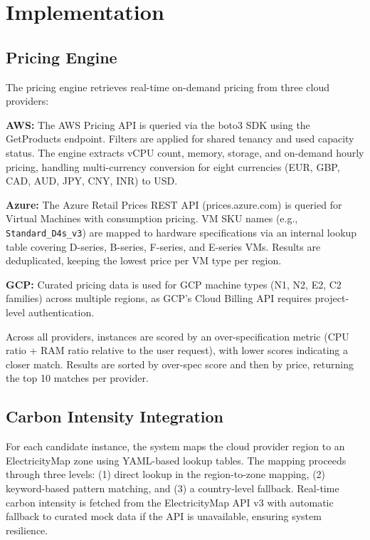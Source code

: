 \documentclass[12pt]{article}
\begin{document}
\section{Implementation}

\subsection{Pricing Engine}

The pricing engine retrieves real-time on-demand pricing from three cloud providers:

\textbf{AWS:} The AWS Pricing API is queried via the boto3 SDK using the GetProducts endpoint. Filters are applied for shared tenancy and used capacity status. The engine extracts vCPU count, memory, storage, and on-demand hourly pricing, handling multi-currency conversion for eight currencies (EUR, GBP, CAD, AUD, JPY, CNY, INR) to USD.

\textbf{Azure:} The Azure Retail Prices REST API (prices.azure.com) is queried for Virtual Machines with consumption pricing. VM SKU names (e.g., \texttt{Standard\_D4s\_v3}) are mapped to hardware specifications via an internal lookup table covering D-series, B-series, F-series, and E-series VMs. Results are deduplicated, keeping the lowest price per VM type per region.

\textbf{GCP:} Curated pricing data is used for GCP machine types (N1, N2, E2, C2 families) across multiple regions, as GCP's Cloud Billing API requires project-level authentication.

Across all providers, instances are scored by an over-specification metric (CPU ratio + RAM ratio relative to the user request), with lower scores indicating a closer match. Results are sorted by over-spec score and then by price, returning the top 10 matches per provider.

\subsection{Carbon Intensity Integration}

For each candidate instance, the system maps the cloud provider region to an ElectricityMap zone using YAML-based lookup tables. The mapping proceeds through three levels: (1) direct lookup in the region-to-zone mapping, (2) keyword-based pattern matching, and (3) a country-level fallback. Real-time carbon intensity is fetched from the ElectricityMap API v3 with automatic fallback to curated mock data if the API is unavailable, ensuring system resilience.
\end{document}

